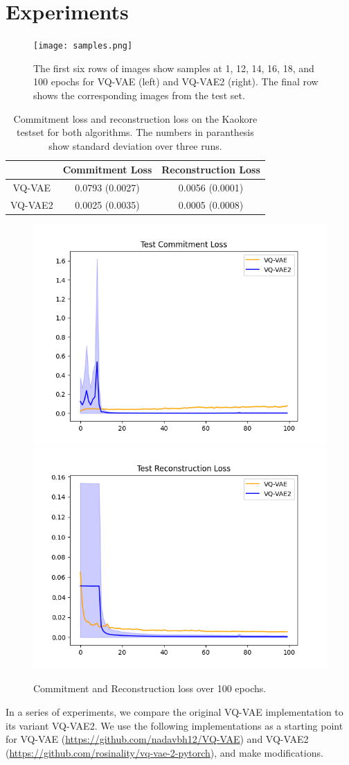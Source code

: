 \documentclass{article}
\begin{document}
\section{Experiments}

\begin{figure}
    \centering
    \texttt{[image: samples.png]}
    \label{fig:samples}
    \caption{The first six rows of images show samples at 1, 12, 14, 16, 18, and 100 epochs for VQ-VAE (left) and VQ-VAE2 (right). The final row shows the corresponding images from the test set.}
\end{figure} 

\begin{table}
    \centering
    \begin{tabular}{c c c}
        & Commitment Loss & Reconstruction Loss \\
        \hline
        VQ-VAE & 0.0793 (0.0027) & 0.0056 (0.0001) \\
        VQ-VAE2 & 0.0025 (0.0035) & 0.0005 (0.0008)
    \end{tabular}
    \label{table:loss}
    \caption{Commitment loss and reconstruction loss on the Kaokore testset for both algorithms. The numbers in paranthesis show standard deviation over three runs.}
\end{table}

\begin{figure}
    \centering
    \includegraphics[width=.4\linewidth]{commit.png}
    \includegraphics[width=.4\linewidth]{recon.png}
    \caption{Commitment and Reconstruction loss over 100 epochs.}
    \label{fig:loss}
\end{figure}

In a series of experiments, we compare the original VQ-VAE implementation to its variant VQ-VAE2. We use the following implementations as a starting point for VQ-VAE (\url{https://github.com/nadavbh12/VQ-VAE}) and VQ-VAE2 (\url{https://github.com/rosinality/vq-vae-2-pytorch}), and make modifications.
\end{document}
